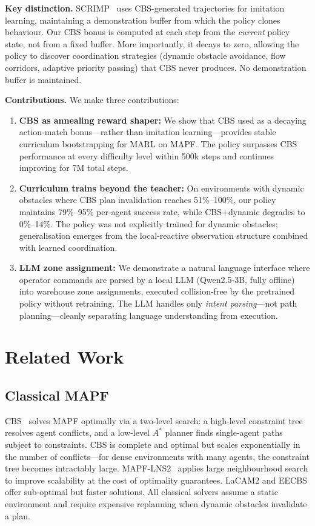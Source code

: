 \documentclass[letterpaper,twocolumn,10pt]{article}
\begin{document}
\textbf{Key distinction.} SCRIMP~\cite{scrimp2023} uses CBS-generated trajectories
for imitation learning, maintaining a demonstration buffer from which the policy
clones behaviour. Our CBS bonus is computed at each step from the \emph{current}
policy state, not from a fixed buffer. More importantly, it decays to zero, allowing
the policy to discover coordination strategies (dynamic obstacle avoidance, flow
corridors, adaptive priority passing) that CBS never produces. No demonstration
buffer is maintained.

\textbf{Contributions.} We make three contributions:
\begin{enumerate}[leftmargin=*,itemsep=2pt,topsep=2pt]
  \item \textbf{CBS as annealing reward shaper:} We show that CBS used as a decaying
    action-match bonus---rather than imitation learning---provides stable curriculum
    bootstrapping for MARL on MAPF. The policy surpasses CBS performance at every
    difficulty level within 500k steps and continues improving for 7M total steps.
  \item \textbf{Curriculum trains beyond the teacher:} On environments with dynamic
    obstacles where CBS plan invalidation reaches 51\%--100\%, our policy maintains
    79\%--95\% per-agent success rate, while CBS+dynamic degrades to 0\%--14\%. The
    policy was not explicitly trained for dynamic obstacles; generalisation emerges
    from the local-reactive observation structure combined with learned coordination.
  \item \textbf{LLM zone assignment:} We demonstrate a natural language interface
    where operator commands are parsed by a local LLM (Qwen2.5-3B, fully offline)
    into warehouse zone assignments, executed collision-free by the pretrained policy
    without retraining. The LLM handles only \emph{intent parsing}---not path
    planning---cleanly separating language understanding from execution.
\end{enumerate}

\section{Related Work}

\subsection{Classical MAPF}

CBS~\cite{sharon2015cbs} solves MAPF optimally via a two-level search: a
high-level constraint tree resolves agent conflicts, and a low-level $A^*$ planner
finds single-agent paths subject to constraints. CBS is complete and optimal but
scales exponentially in the number of conflicts---for dense environments with many
agents, the constraint tree becomes intractably large. MAPF-LNS2~\cite{li2021mapflns2}
applies large neighbourhood search to improve scalability at the cost of optimality
guarantees. LaCAM2 and EECBS offer sub-optimal but faster solutions. All classical
solvers assume a static environment and require expensive replanning when dynamic
obstacles invalidate a plan.
\end{document}
